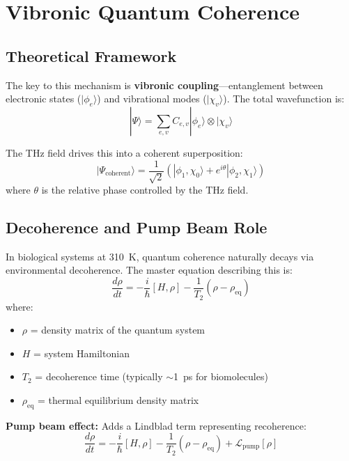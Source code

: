 \section{Vibronic Quantum Coherence}

\subsection{Theoretical Framework}

The key to this mechanism is \textbf{vibronic coupling}---entanglement between electronic states ($|\phi_e\rangle$) and vibrational modes ($|\chi_v\rangle$). The total wavefunction is:
\begin{equation}
|\Psi\rangle = \sum_{e,v} C_{e,v} |\phi_e\rangle \otimes |\chi_v\rangle
\label{eq:vibronic-state}
\end{equation}

The THz field drives this into a coherent superposition:
\begin{equation}
|\Psi_{\text{coherent}}\rangle = \frac{1}{\sqrt{2}}\left(|\phi_1, \chi_0\rangle + e^{i\theta}|\phi_2, \chi_1\rangle\right)
\label{eq:coherent-superposition}
\end{equation}
where $\theta$ is the relative phase controlled by the THz field.

\subsection{Decoherence and Pump Beam Role}

In biological systems at 310~K, quantum coherence naturally decays via environmental decoherence. The master equation describing this is:
\begin{equation}
\frac{d\rho}{dt} = -\frac{i}{\hbar}[H, \rho] - \frac{1}{T_2}(\rho - \rho_{\text{eq}})
\label{eq:decoherence}
\end{equation}
where:
\begin{itemize}
\item $\rho$ = density matrix of the quantum system
\item $H$ = system Hamiltonian
\item $T_2$ = decoherence time (typically $\sim$1~ps for biomolecules)
\item $\rho_{\text{eq}}$ = thermal equilibrium density matrix
\end{itemize}

\textbf{Pump beam effect:} Adds a Lindblad term representing recoherence:
\begin{equation}
\frac{d\rho}{dt} = -\frac{i}{\hbar}[H, \rho] - \frac{1}{T_2}(\rho - \rho_{\text{eq}}) + \mathcal{L}_{\text{pump}}[\rho]
\label{eq:pumped-system}
\end{equation}

